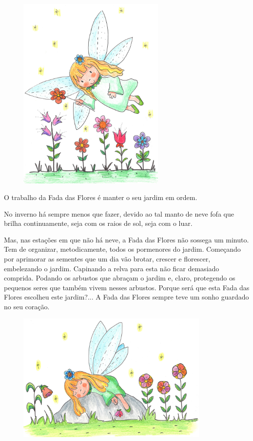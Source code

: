 \documentclass[12pt, a4paper, twoside]{memoir}
\begin{document}
\begin{figure}[h]
    \centering
    \includegraphics[width=0.65\textwidth]{voando}
\end{figure}

O trabalho da Fada das Flores é manter o seu jardim em ordem.

No inverno há sempre menos que fazer, devido ao tal manto de neve fofa que brilha continuamente, seja com os raios de sol, seja com o luar.

Mas, nas estações em que não há neve, a Fada das Flores não sossega um minuto. Tem de organizar, metodicamente, todos os pormenores do jardim. Começando por aprimorar as sementes que um dia vão brotar, crescer e florescer, embelezando o jardim. Capinando a relva para esta não ficar demasiado comprida. Podando os arbustos que abraçam o jardim e, claro, protegendo os pequenos seres que também vivem nesses arbustos.
\newpage
Porque será que esta Fada das Flores escolheu este jardim?...
\bigbreak
A Fada das Flores sempre teve um sonho guardado no seu coração.

\begin{figure}[h]
    \centering
    \includegraphics[width=0.85\textwidth]{a_dormir}
\end{figure}
\end{document}
